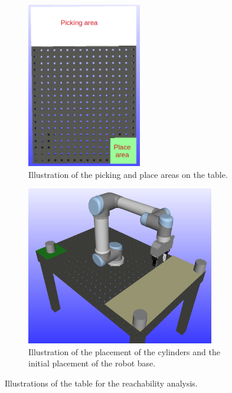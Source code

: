 \documentclass[../main.tex]{subfiles}
\begin{document}
\begin{figure}[H]
    \centering
    \begin{subfigure}[b]{0.49\textwidth}
        \centering
        \captionsetup{width=0.55\textwidth}
        \includegraphics[width=0.55\textwidth]{figures/workcell_setup/pick_and_place.png}
        \caption{Illustration of the picking and place areas on the table.}
        \label{subfig:table_areas}
    \end{subfigure}
    \begin{subfigure}[b]{0.49\textwidth}
        \centering
        \captionsetup{width=0.9\textwidth}
        \includegraphics[width=0.9\textwidth]{figures/workcell_setup/placement_of_cylinders.png}
        \caption{Illustration of the placement of the cylinders and the initial placement of the robot base.}
        \label{subfig:placement_of_cylinders}
    \end{subfigure}
    \caption{Illustrations of the table for the reachability analysis.}
    \label{fig:table}
\end{figure}
\end{document}
